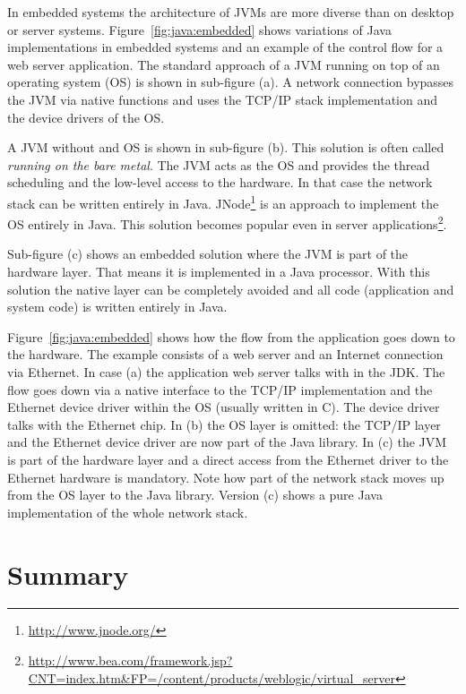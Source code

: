 In embedded systems the architecture of JVMs are more diverse than
on desktop or server systems. Figure~\ref{fig:java:embedded} shows
variations of Java implementations in embedded systems and an
example of the control flow for a web server application. The
standard approach of a JVM running on top of an operating system
(OS) is shown in sub-figure (a). A network connection bypasses the
JVM via native functions and uses the TCP/IP stack implementation
and the device drivers of the OS.

A JVM without and OS is shown in sub-figure (b). This solution is
often called \emph{running on the bare metal}. The JVM acts as the
OS and provides the thread scheduling and the low-level access to
the hardware. In that case the network stack can be written entirely
in Java. JNode\footnote{\url{http://www.jnode.org/}} is an approach
to implement the OS entirely in Java. This solution becomes popular
even in server
applications\footnote{\url{http://www.bea.com/framework.jsp?CNT=index.htm&FP=/content/products/weblogic/virtual_server}
}.

Sub-figure (c) shows an embedded solution where the JVM is part of
the hardware layer. That means it is implemented in a Java
processor. With this solution the native layer can be completely
avoided and all code (application and system code) is written
entirely in Java.

Figure~\ref{fig:java:embedded} shows how the flow from the
application goes down to the hardware. The example consists of a web
server and an Internet connection via Ethernet. In case (a) the
application web server talks with  in the JDK. The
flow goes down via a native interface to the TCP/IP implementation
and the Ethernet device driver within the OS (usually written in C).
The device driver talks with the Ethernet chip. In (b) the OS layer
is omitted: the TCP/IP layer and the Ethernet device driver are now
part of the Java library. In (c) the JVM is part of the hardware
layer and a direct access from the Ethernet driver to the Ethernet
hardware is mandatory. Note how part of the network stack moves up
from the OS layer to the Java library. Version (c) shows a pure Java
implementation of the whole network stack.


\section{Summary}

